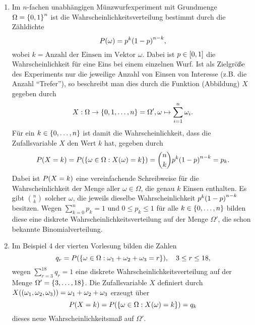 \documentclass{lecture}
\begin{document}
    \begin{example}
        \begin{enumerate}
            \item Im \(n\)-fachen unabhängigen Münzwurfexperiment mit Grundmenge \(\Omega = \braces*{0, 1}^n\) ist die Wahrscheinlichkeitsverteilung bestimmt durch die Zähldichte
            \[
                P\parentheses*{\omega} = p^k\parentheses*{1 - p}^{n - k},
            \]
            wobei \(k = \text{Anzahl der Einsen im Vektor }\omega\).
            Dabei ist \(p \in \brackets*{0, 1}\) die Wahrscheinlichkeit für eine Eins bei einem einzelnen Wurf.
            Ist als Zielgröße des Experiments nur die jeweilige Anzahl von Einsen von Interesse (z.B. die Anzahl ``Trefer''), so beschreibt man dies durch die Funktion (Abbildung) \(X\) gegeben durch
            \[
                X: \Omega \to \braces*{0, 1, \ldots, n} = \Omega', \omega \mapsto \sum_{i = 1}^n \omega_i.
            \]
            Für ein \(k \in \braces*{0, \ldots, n}\) ist damit die Wahrscheinlichkeit, dass die Zufallsvariable \(X\) den Wert \(k\) hat, gegeben durch
            \[
                P\parentheses*{X = k} = P\parentheses*{\braces*{\omega \in \Omega : X\parentheses*{\omega} = k}} = \binom{n}{k}p^k\parentheses*{1 - p}^{n - k} = p_k.
            \]
            Dabei ist \(P\parentheses*{X = k}\)  eine vereinfachende Schreibweise für die Wahrscheinlichkeit der Menge aller \(\omega \in \Omega\), die genau \(k\) Einsen enthalten.
            Es gibt \(\binom{n}{k}\) solcher \(\omega\), die jeweils dieselbe Wahrscheinlichkeit \(p^k\parentheses*{1 - p}^{n - k}\) besitzen.
            Wegen \(\sum_{k = 0}^n p_k = 1\) und \(0 \le p_k \le 1\) für alle \(k \in \braces*{0, \ldots, n}\) bilden diese eine diskrete Wahrscheinlichkeitsverteilung auf der Menge \(\Omega'\), die schon bekannte Binomialverteilung.
            \item Im Beispiel 4 der vierten Vorlesung bilden die Zahlen
            \[
                q_r = P\parentheses*{\braces*{\omega \in \Omega : \omega_1 + \omega_2 + \omega_3 = r}}, \quad 3 \le r \le 18,
            \]
            wegen \(\sum_{r = 3}^{18}q_r = 1\) eine diskrete Wahrscheinlichkeitsverteilung auf der Menge \(\Omega' = \braces*{3, \ldots, 18}\).
            Die Zufallsvariable \(X\) definiert durch \(X\parentheses*{\parentheses*{\omega_1, \omega_2, \omega_3}} = \omega_1 + \omega_2 + \omega_3\) erzeugt über
            \[
                P\parentheses*{X = k} = P\parentheses*{\braces*{\omega \in \Omega : X\parentheses*{\omega} = k}} = q_k
            \]
            dieses neue Wahrscheinlichkeitsmaß auf \(\Omega'\).
        \end{enumerate}
    \end{example}
\end{document}
